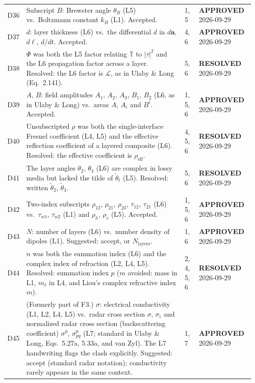 \documentclass[11pt, oneside]{article}
\newcommand{\approved}{\textbf{APPROVED}}
\newcommand{\resolved}{\textbf{RESOLVED}}
\begin{document}
\begin{longtable}{l >{\raggedright\arraybackslash}p{} l l}
D36 & Subscript $B$: Brewster angle $\theta_B$ (L5) vs.\ Boltzmann constant $k_B$ (L1). Accepted. & 1, 5 & \approved{} 2026-09-29 \\
D37 & $d$: layer thickness (L6) vs.\ the differential $d$ in $d\mathbf{a}$, $d\boldsymbol{\ell}$, $d/dt$. Accepted. & 4, 6 & \approved{} 2026-09-29 \\
D38 & $\Phi$ was both the L5 factor relating $\mathbb{T}$ to $|\tau|^2$ and the L6 propagation factor across a layer. Resolved: the L6 factor is $\mathcal{L}$, as in Ulaby \& Long (Eq.~2.141). & 5, 6 & \resolved{} 2026-09-29 \\
D39 & $A$, $B$: field amplitudes $A_1$, $A_2$, $A_3$, $B_1$, $B_2$ (L6, as in Ulaby \& Long) vs.\ areas $A$, $A_i$ and $B^i$. Accepted. & 1, 5, 6 & \approved{} 2026-09-29 \\
D40 & Unsubscripted $\rho$ was both the single-interface Fresnel coefficient (L4, L5) and the effective reflection coefficient of a layered composite (L6). Resolved: the effective coefficient is $\rho_\mathrm{eff}$. & 4, 5, 6 & \resolved{} 2026-09-29 \\
D41 & The layer angles $\theta_2$, $\theta_3$ (L6) are complex in lossy media but lacked the tilde of $\tilde{\theta}_t$ (L5). Resolved: written $\tilde{\theta}_2$, $\tilde{\theta}_3$. & 5, 6 & \resolved{} 2026-09-29 \\
D42 & Two-index subscripts $\rho_{12}$, $\rho_{21}$, $\rho_{23}$, $\tau_{12}$, $\tau_{21}$ (L6) vs.\ $\tau_{w1}$, $\tau_{w2}$ (L1) and $\rho_h$, $\rho_v$ (L5). Accepted. & 1, 5, 6 & \approved{} 2026-09-29 \\
D43 & $N$: number of layers (L6) vs.\ number density of dipoles (L1). Suggested: accept, or $N_\mathrm{layers}$. & 1, 6 & \approved{} 2026-09-29 \\
D44 & $n$ was both the summation index (L6) and the complex index of refraction (L2, L4, L5). Resolved: summation index $p$ ($m$ avoided: mass in L1, $m_\ell$ in L4, and Liou's complex refractive index $m$). & 2, 4, 5, 6 & \resolved{} 2026-09-29 \\
D45 & (Formerly part of F3.) $\sigma$: electrical conductivity (L1, L2, L4, L5) vs.\ radar cross section $\sigma$, $\sigma_i$ and normalized radar cross section (backscattering coefficient) $\sigma^0$, $\sigma^0_{pq}$ (L7; standard in Ulaby \& Long, Eqs.~5.27a, 5.33a, and van Zyl). The L7 handwriting flags the clash explicitly. Suggested: accept (standard radar notation); conductivity rarely appears in the same context. & 1, 7 & \approved{} 2026-09-29 \\

\end{longtable}
\end{document}
